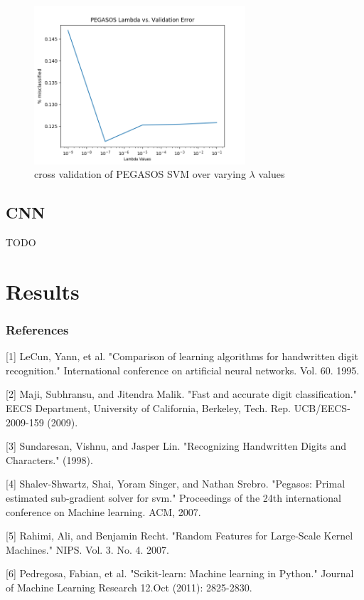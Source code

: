 \documentclass{article} %
\begin{document}
\begin{figure}[h]
\centering
\includegraphics[width=0.7\textwidth]{pegasos-lambda-cv.png}
\caption{cross validation of PEGASOS SVM over varying $\lambda$ values}
\label{fig:pegasos-lambda-cv}
\end{figure}

\subsection{CNN}
TODO

\section{Results} \label{results}

\subsubsection*{References}

\small{
  [1] LeCun, Yann, et al. "Comparison of learning algorithms for handwritten
  digit recognition." International conference on artificial neural networks.
  Vol. 60. 1995.	

  [2] Maji, Subhransu, and Jitendra Malik. "Fast and accurate digit
  classification." EECS Department, University of California,
  Berkeley, Tech. Rep. UCB/EECS-2009-159 (2009).

  [3] Sundaresan, Vishnu, and Jasper Lin. "Recognizing Handwritten Digits and
  Characters." (1998).

  [4] Shalev-Shwartz, Shai, Yoram Singer, and Nathan Srebro. "Pegasos: Primal
  estimated sub-gradient solver for svm." Proceedings of the 24th international
  conference on Machine learning. ACM, 2007.

  [5] Rahimi, Ali, and Benjamin Recht. "Random Features for Large-Scale Kernel
  Machines." NIPS. Vol. 3. No. 4. 2007.

  [6] Pedregosa, Fabian, et al. "Scikit-learn: Machine learning in Python."
  Journal of Machine Learning Research 12.Oct (2011): 2825-2830.
}
\end{document}
